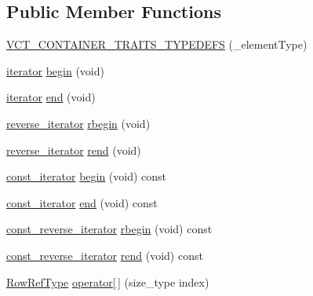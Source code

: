 \subsection*{Public Member Functions}
\begin{DoxyCompactItemize}
\item 
\hyperlink{classvct_dynamic_matrix_base_a9b74344e1642b42867b98720ed1ad438}{V\-C\-T\-\_\-\-C\-O\-N\-T\-A\-I\-N\-E\-R\-\_\-\-T\-R\-A\-I\-T\-S\-\_\-\-T\-Y\-P\-E\-D\-E\-F\-S} (\-\_\-element\-Type)
\item 
\hyperlink{classvct_dynamic_const_matrix_base_aee4b4524b7972fd1b324cba62505a949}{iterator} \hyperlink{classvct_dynamic_matrix_base_a8e125be29ccb28a13af84680926fee6f}{begin} (void)
\item 
\hyperlink{classvct_dynamic_const_matrix_base_aee4b4524b7972fd1b324cba62505a949}{iterator} \hyperlink{classvct_dynamic_matrix_base_ad99c7e972083d4a5377bc2516ce3426b}{end} (void)
\item 
\hyperlink{classvct_dynamic_const_matrix_base_a53905f35527b9ce433c246ab50a6b812}{reverse\-\_\-iterator} \hyperlink{classvct_dynamic_matrix_base_a61a464c0f702516f2f165227afd2c8b0}{rbegin} (void)
\item 
\hyperlink{classvct_dynamic_const_matrix_base_a53905f35527b9ce433c246ab50a6b812}{reverse\-\_\-iterator} \hyperlink{classvct_dynamic_matrix_base_a487009a6380b8016848b1f194f0b17bf}{rend} (void)
\item 
\hyperlink{classvct_dynamic_const_matrix_base_a665b16a8ecd8b6febb4d193efa42205e}{const\-\_\-iterator} \hyperlink{classvct_dynamic_matrix_base_a0e89cf694e8502ca5a1701a27dc4ec87}{begin} (void) const 
\item 
\hyperlink{classvct_dynamic_const_matrix_base_a665b16a8ecd8b6febb4d193efa42205e}{const\-\_\-iterator} \hyperlink{classvct_dynamic_matrix_base_a5c927de2694d1f35464fa02df53e5771}{end} (void) const 
\item 
\hyperlink{classvct_dynamic_const_matrix_base_afc30420e745eed5f1c838a01088ddc84}{const\-\_\-reverse\-\_\-iterator} \hyperlink{classvct_dynamic_matrix_base_a5c755e09c3fbe858a3b03381ccb8e3ac}{rbegin} (void) const 
\item 
\hyperlink{classvct_dynamic_const_matrix_base_afc30420e745eed5f1c838a01088ddc84}{const\-\_\-reverse\-\_\-iterator} \hyperlink{classvct_dynamic_matrix_base_a3870baf5cb2fc8c1af4b3c54cd0745bf}{rend} (void) const 
\item 
\hyperlink{classvct_dynamic_const_matrix_base_a15b845e745a76559d730ecef10a991b7}{Row\-Ref\-Type} \hyperlink{classvct_dynamic_matrix_base_a568fa0287c710ffbb872ba33d4f1fb3b}{operator\mbox{[}$\,$\mbox{]}} (size\-\_\-type index)

\end{DoxyCompactItemize}
